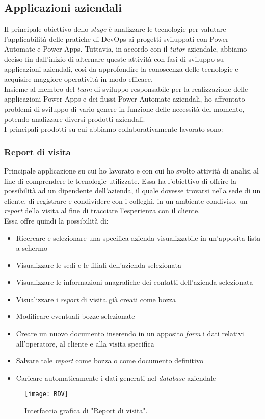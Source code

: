 \subsection{Applicazioni aziendali}
Il principale obiettivo dello \emph{stage} è analizzare le tecnologie per valutare l'applicabilità delle pratiche di \gls{DevOps} ai progetti sviluppati con Power Automate e Power Apps.
Tuttavia, in accordo con il \emph{tutor} aziendale, abbiamo deciso fin dall'inizio di alternare queste attività con fasi di sviluppo su applicazioni aziendali, così da approfondire la conoscenza delle tecnologie e acquisire maggiore operatività in modo efficace.\\
Insieme al membro del \emph{team} di sviluppo responsabile per la realizzazione delle applicazioni Power Apps e dei flussi Power Automate aziendali, ho affrontato problemi di sviluppo di vario genere in funzione delle necessità del momento, potendo analizzare diversi prodotti aziendali.\\
I principali prodotti su cui abbiamo collaborativamente lavorato sono:

\subsubsection*{Report di visita}
Principale applicazione su cui ho lavorato e con cui ho svolto attività di analisi al fine di comprendere le tecnologie utilizzate.
Essa ha l'obiettivo di offrire la possibilità ad un dipendente dell'azienda, il quale dovesse trovarsi nella sede di un cliente, di registrare e condividere con i colleghi, in un ambiente condiviso, un \emph{report} della visita al fine di tracciare l'esperienza con il cliente.\\
Essa offre quindi la possibilità di: 
\begin{itemize}
    \item Ricercare e selezionare una specifica azienda visualizzabile in un'apposita lista a schermo 
    \item Visualizzare le sedi e le filiali dell'azienda selezionata 
    \item Visualizzare le informazioni anagrafiche dei contatti dell'azienda selezionata  
    \item Visualizzare i \emph{report} di visita già creati come bozza  
    \item Modificare eventuali bozze selezionate 
    \item Creare un nuovo documento inserendo in un apposito \emph{form} i dati relativi all'operatore, al cliente e alla visita specifica 
    \item Salvare tale \emph{report} come bozza o come documento definitivo
    \item Caricare automaticamente i dati generati nel \emph{database} aziendale 
\end{itemize}
\begin{figure}[htbp] 
    \centering 
    \texttt{[image: RDV]} 
    \caption{Interfaccia grafica di "Report di visita".}
    \label{fig:RDV}
\end{figure}

